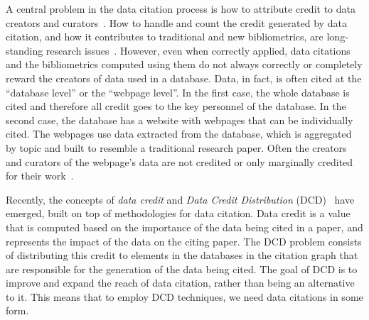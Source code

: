 A central problem in the data citation process is how to attribute credit to data creators and curators~\cite{buneman2019summ}. 
How to handle and count the credit generated by data citation, and how it contributes to traditional and new bibliometrics, are long-standing research issues~\citep{garfield1999journal,Borgman2016}.
However, even when correctly applied, data citations and the bibliometrics computed using them do not always correctly or completely reward the creators of data used in a database.
Data, in fact, is often cited at the ``database level'' or the ``webpage level''. 
In the first case, the whole database is cited and therefore all credit goes to the key personnel of the database.
In the second case, the database has a website with webpages that can be individually cited. 
The webpages use data extracted from the database, which is aggregated by topic and built to resemble a traditional research paper.
Often the creators and curators of the webpage's data are not credited or only marginally credited for their work~\citep{AlawiniDSTW17}.

Recently, the concepts of \emph{data credit} and \emph{Data Credit Distribution} (DCD)~\citep{creditFang18,transitiveCreditKatz2014,zeng2020assigning} have emerged, built on top of methodologies for data citation. 
Data credit is a value that is computed based on the importance of the data being cited in a paper, and represents the impact of the data on the citing paper. 
The DCD problem consists of distributing this credit to elements in the databases in the citation graph that are responsible for the generation of the data being cited. The goal of DCD is to improve and expand the reach of data citation, rather than being an alternative to it. This means that to employ DCD techniques, we need data citations in some form.


